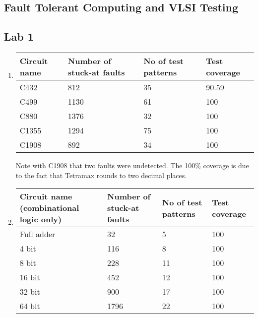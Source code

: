 \documentclass[a4paper,12pt]{article}
\begin{document}
    \begin{center}
        \section*{Fault Tolerant Computing and VLSI Testing}
        \subsection*{Lab 1}
    \end{center}

    \begin{enumerate}

        \item \begin{tabularx}{\textwidth}{|X|X|X|X|}
                \hline
                Circuit name & Number of stuck-at faults & No of test patterns & Test coverage \\ \hline
                C432 & 812 & 35 & 90.59 \\ \hline
                C499 & 1130 & 61 & 100 \\ \hline
                C880 & 1376 & 32 & 100 \\ \hline
                C1355 & 1294 & 75 & 100 \\ \hline
                C1908 & 892 & 34 & 100 \\ \hline
            \end{tabularx}

            Note with C1908 that two faults were undetected. The 100\% coverage is due to the fact that Tetramax rounds to two decimal places.

        \item \begin{tabularx}{\textwidth}{|X|X|X|X|}
                \hline
                Circuit name (combinational logic only) & Number of stuck-at faults & No of test patterns & Test coverage \\ \hline
                Full adder & 32 & 5 & 100 \\ \hline
                4 bit & 116 & 8 & 100 \\ \hline
                8 bit & 228 & 11 & 100 \\ \hline
                16 bit & 452 & 12 & 100 \\ \hline
                32 bit & 900 & 17 & 100 \\ \hline
                64 bit & 1796 & 22 & 100 \\ \hline
            \end{tabularx}


\end{enumerate}
\end{document}

